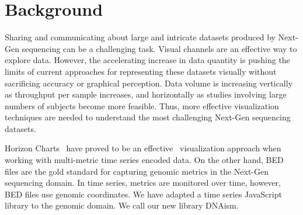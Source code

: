 \documentclass[twocolumn]{bmcart}
\begin{document}


\section*{Background}

Sharing and communicating about large and intricate datasets produced by
Next-Gen sequencing can be a challenging task. Visual channels are an effective
way to explore data. However, the accelerating increase in data quantity is
pushing the limits of current approaches for representing these datasets
visually without sacrificing accuracy or graphical perception.  Data volume is
increasing vertically as throughput per sample increases, and horizontally as
studies involving large numbers of subjects become more feasible.  Thus, more
effective visualization techniques are needed to understand the most
challenging Next-Gen sequencing datasets.

Horizon Charts~\cite{time-in-the-horizon} have proved to be an
effective~\cite{2009-horizon} visualization approach when working with
multi-metric time series encoded data.  On the other hand, BED files are the
gold standard for capturing genomic metrics in the Next-Gen sequencing domain.
In time series, metrics are monitored over time, however, BED files use genomic
coordinates. We have adapted a time series JavaScript library to the genomic
domain. We call our new library DNAism.
\end{document}
